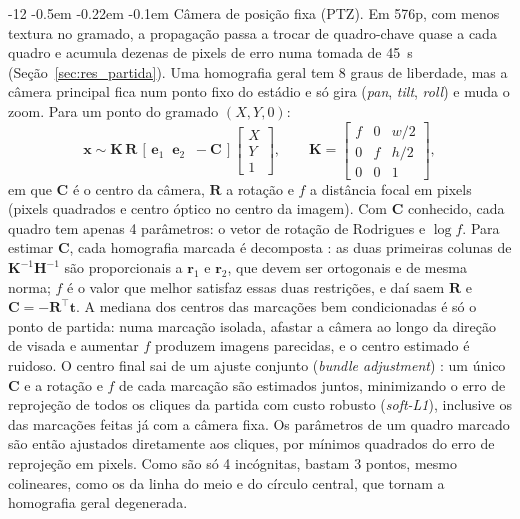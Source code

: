 \documentclass[12pt]{article}
\makeatletter
\renewcommand\paragraph{\@startsection{paragraph}{4}{\z@}%
                       {-12\p@ \@plus -4\p@ \@minus -4\p@}%
                       {-0.5em \@plus -0.22em \@minus -0.1em}%
                       {\normalfont\normalsize\itshape}}
\makeatother
\begin{document}
\paragraph{Câmera de posição fixa (PTZ).} Em 576p, com menos textura no gramado, a
propagação passa a trocar de quadro-chave quase a cada quadro e acumula dezenas de
pixels de erro numa tomada de 45~s (Seção~\ref{sec:res_partida}). Uma homografia
geral tem 8 graus de liberdade, mas a câmera principal fica num ponto fixo do
estádio e só gira (\textit{pan}, \textit{tilt}, \textit{roll}) e muda o zoom. Para um
ponto do gramado $(X, Y, 0)$:
\begin{equation}
\mathbf{x} \sim \mathbf{K}\,\mathbf{R}\,[\,\mathbf{e}_1 \;\; \mathbf{e}_2 \;\; -\mathbf{C}\,]
\begin{bmatrix} X \\ Y \\ 1 \end{bmatrix}, \qquad
\mathbf{K} = \begin{bmatrix} f & 0 & w/2 \\ 0 & f & h/2 \\ 0 & 0 & 1 \end{bmatrix},
\end{equation}
em que $\mathbf{C}$ é o centro da câmera, $\mathbf{R}$ a rotação e $f$ a distância
focal em pixels (pixels quadrados e centro óptico no centro da imagem). Com
$\mathbf{C}$ conhecido, cada quadro tem apenas 4 parâmetros: o vetor de rotação de
Rodrigues e $\log f$. Para estimar $\mathbf{C}$, cada homografia marcada é
decomposta \cite{hartley2004}: as duas primeiras colunas de
$\mathbf{K}^{-1}\mathbf{H}^{-1}$ são proporcionais a $\mathbf{r}_1$ e $\mathbf{r}_2$, que
devem ser ortogonais e de mesma norma; $f$ é o valor que melhor satisfaz essas duas
restrições, e daí saem $\mathbf{R}$ e $\mathbf{C} = -\mathbf{R}^\top\mathbf{t}$. A mediana
dos centros das marcações bem condicionadas é só o ponto de partida: numa marcação
isolada, afastar a câmera ao longo da direção de visada e aumentar $f$ produzem
imagens parecidas, e o centro estimado é ruidoso. O centro final sai de um ajuste
conjunto (\textit{bundle adjustment}) \cite{hartley2004}: um único $\mathbf{C}$ e a
rotação e $f$ de cada marcação são estimados juntos, minimizando o erro de
reprojeção de todos os cliques da partida com custo robusto (\textit{soft-L1}),
inclusive os das marcações feitas já com a câmera fixa. Os parâmetros de um
quadro marcado são então ajustados diretamente aos cliques, por mínimos quadrados
do erro de reprojeção em pixels. Como são só 4 incógnitas, bastam 3 pontos, mesmo
colineares, como os da linha do meio e do círculo central, que tornam a homografia
geral degenerada.
\end{document}

